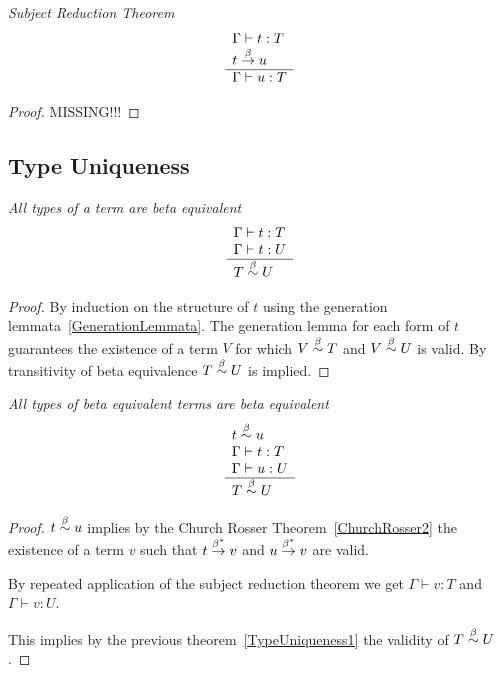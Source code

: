 \begin{theorem}
    \label{SubjectReductionTheorem}
    \emph{Subject Reduction Theorem}
    $$
    \begin{array}{l} 
        \Gamma \vdash t : T
        \\
        t \stackrel{\beta}{\to} u
     \\ \hline 
        \Gamma \vdash u: T
    \end{array}
    $$

    \begin{proof}
        MISSING!!!
    \end{proof}
\end{theorem}





\subsection{Type Uniqueness}


\begin{theorem}
    \label{TypeUniqueness1}
    \emph{All types of a term are beta equivalent}
    $$
    \begin{array}{l} 
        \Gamma \vdash t : T
        \\
        \Gamma \vdash t : U
     \\ \hline 
        T \stackrel{\beta}{\sim} U
    \end{array}
    $$

    \begin{proof}
        By induction on the structure of $t$ using the generation
        lemmata~\ref{GenerationLemmata}. The generation lemma for each form of
        $t$ guarantees the existence of a term $V$ for which $V \stackrel{\beta}{\sim} T$ and
        $V \stackrel{\beta}{\sim} U$ is valid. By transitivity of beta equivalence $T \stackrel{\beta}{\sim}
        U$ is implied.
    \end{proof}
\end{theorem}



\begin{theorem}
    \label{TypeUniqueness2}
    \emph{All types of beta equivalent terms are beta equivalent}
    $$
    \begin{array}{l} 
        t \stackrel{\beta}{\sim} u
        \\
        \Gamma \vdash t : T
        \\
        \Gamma \vdash u : U
     \\ \hline 
        T \stackrel{\beta}{\sim} U
    \end{array}
    $$

    \begin{proof}
        $ t \stackrel{\beta}{\sim} u$ implies by the Church Rosser Theorem~\ref{ChurchRosser2}
        the existence of a term $v$ such that $t \stackrel{\beta^*}{\to} v$ and $u
        \stackrel{\beta^*}{\to} v$ are valid.

        By repeated application of the subject reduction theorem we get $\Gamma
        \vdash v : T$ and $\Gamma \vdash v : U$.

        This implies by the previous theorem~\ref{TypeUniqueness1} the validity
        of $T \stackrel{\beta}{\sim} U$.
    \end{proof}
\end{theorem}

